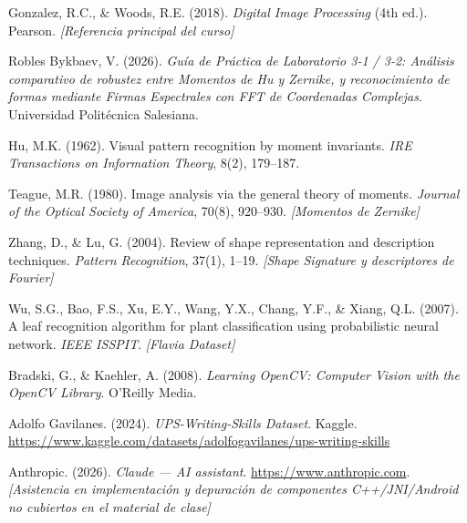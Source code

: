 \documentclass[12pt,a4paper]{article}
\begin{document}
\begin{enumerate}[label={[\arabic*]}]
  \item Gonzalez, R.C., \& Woods, R.E. (2018). \textit{Digital Image Processing} (4th ed.). Pearson. \textit{[Referencia principal del curso]}

  \item Robles Bykbaev, V. (2026). \textit{Guía de Práctica de Laboratorio 3-1 / 3-2: Análisis comparativo de robustez entre Momentos de Hu y Zernike, y reconocimiento de formas mediante Firmas Espectrales con FFT de Coordenadas Complejas}. Universidad Politécnica Salesiana.

  \item Hu, M.K. (1962). Visual pattern recognition by moment invariants. \textit{IRE Transactions on Information Theory}, 8(2), 179--187.

  \item Teague, M.R. (1980). Image analysis via the general theory of moments. \textit{Journal of the Optical Society of America}, 70(8), 920--930. \textit{[Momentos de Zernike]}

  \item Zhang, D., \& Lu, G. (2004). Review of shape representation and description techniques. \textit{Pattern Recognition}, 37(1), 1--19. \textit{[Shape Signature y descriptores de Fourier]}

  \item Wu, S.G., Bao, F.S., Xu, E.Y., Wang, Y.X., Chang, Y.F., \& Xiang, Q.L. (2007). A leaf recognition algorithm for plant classification using probabilistic neural network. \textit{IEEE ISSPIT}. \textit{[Flavia Dataset]}

  \item Bradski, G., \& Kaehler, A. (2008). \textit{Learning OpenCV: Computer Vision with the OpenCV Library}. O'Reilly Media.

  \item Adolfo Gavilanes. (2024). \textit{UPS-Writing-Skills Dataset}. Kaggle. \url{https://www.kaggle.com/datasets/adolfogavilanes/ups-writing-skills}

  \item Anthropic. (2026). \textit{Claude — AI assistant}. \url{https://www.anthropic.com}. \textit{[Asistencia en implementación y depuración de componentes C++/JNI/Android no cubiertos en el material de clase]}
\end{enumerate}
\end{document}
